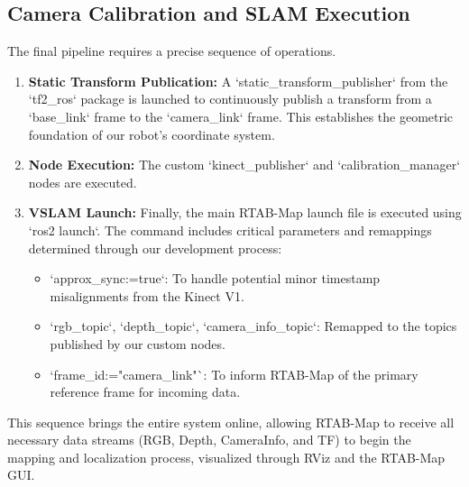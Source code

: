 \documentclass[a4paper,12pt]{article}
\begin{document}
\subsection{Camera Calibration and SLAM Execution}
The final pipeline requires a precise sequence of operations.
\begin{enumerate}
    \item \textbf{Static Transform Publication:} A `static\_transform\_publisher` from the `tf2\_ros` package is launched to continuously publish a transform from a `base\_link` frame to the `camera\_link` frame. This establishes the geometric foundation of our robot's coordinate system.
    \item \textbf{Node Execution:} The custom `kinect\_publisher` and `calibration\_manager` nodes are executed.
    \item \textbf{VSLAM Launch:} Finally, the main RTAB-Map launch file is executed using `ros2 launch`. The command includes critical parameters and remappings determined through our development process:
    \begin{itemize}
        \item `approx\_sync:=true`: To handle potential minor timestamp misalignments from the Kinect V1.
        \item `rgb\_topic`, `depth\_topic`, `camera\_info\_topic`: Remapped to the topics published by our custom nodes.
        \item `frame\_id:="camera\_link"`: To inform RTAB-Map of the primary reference frame for incoming data.
    \end{itemize}
\end{enumerate}
This sequence brings the entire system online, allowing RTAB-Map to receive all necessary data streams (RGB, Depth, CameraInfo, and TF) to begin the mapping and localization process, visualized through RViz and the RTAB-Map GUI.



\end{document}
